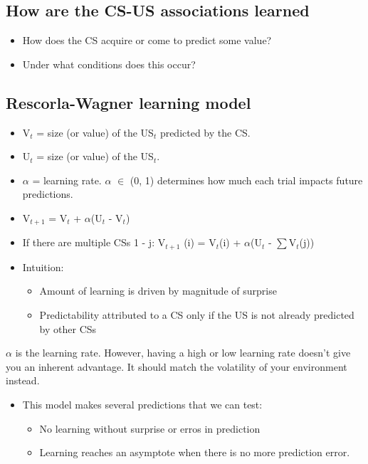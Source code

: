 \subsection{How are the CS-US associations learned}
\begin{itemize}
    \item How does the CS acquire or come to predict some value?
    \item Under what conditions does this occur?
\end{itemize}

\subsection{Rescorla-Wagner learning model}
\begin{itemize}
    \item V$_{t}$ = size (or value) of the US$_{t}$ predicted by the CS.
    \item U$_{t}$ = size (or value) of the US$_{t}$.
    \item $\alpha$ = learning rate. $\alpha$ $\in$ (0, 1) determines how much each trial impacts future predictions.
    \item V$_{t+1}$ = V$_{t}$ + $\alpha$(U$_{t}$ - V$_{t}$)
    \item If there are multiple CSs 1 - j: V$_{t+1}$ (i) = V$_{t}$(i) + $\alpha$(U$_{t}$ - $\sum$V$_{t}$(j))
    \item Intuition:
    \begin{itemize}
        \item Amount of learning is driven by magnitude of surprise
        \item Predictability attributed to a CS only if the US is not already predicted by other CSs
    \end{itemize}
\end{itemize}
$\alpha$ is the learning rate. However, having a high or low learning rate doesn't give you an inherent advantage. It should match the volatility of your environment instead.
\begin{itemize}
    \item This model makes several predictions that we can test:
    \begin{itemize}
        \item No learning without surprise or erros in prediction
        \item Learning reaches an asymptote when there is no more prediction error.
    \end{itemize}
\end{itemize}

